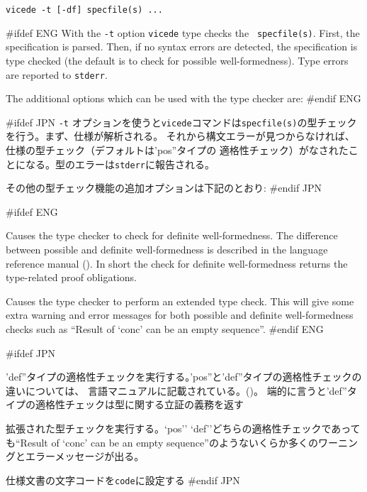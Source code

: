 \documentclass[\pformat,12pt]{article}
\newcommand{\vdmde}{vdmde}
\newcommand{\vdmde}{vppde}
\renewcommand{\vdmde}{vicede}
\newcommand{\aaa}{\tt }
\begin{document}
{\tt \vdmde\ -t [-df] specfile(s) ...}

\vspace{0.5cm}

\noindent
#ifdef ENG
With the {\tt -t} option {\tt \vdmde} type checks the {\tt
  specfile(s)}.  First, the specification is parsed. Then, if no syntax
errors are detected, the specification is type checked (the default
is to check for possible well-formedness). Type errors are reported to
{\aaa stderr}.

The additional options which can be used with the type checker are:
#endif ENG

#ifdef JPN
{\tt -t} オプションを使うと{\tt \vdmde}コマンドは{\tt specfile(s)}の型チェックを行う。まず、仕様が解析される。
それから構文エラーが見つからなければ、仕様の型チェック（デフォルトは'pos''タイプの
適格性チェック）がなされたことになる。型のエラーは{\aaa stderr}に報告される。

その他の型チェック機能の追加オプションは下記のとおり:
#endif JPN

\begin{description}
#ifdef ENG
\item[{\tt -d}] Causes the type checker to check for definite
  well-formedness.  The difference between possible and definite
  well-formedness is described in the language reference manual
  (). In 
  short the check for definite well-formedness returns the
  type-related proof obligations.
  
\item[{\tt -f}] Causes the type checker to perform an extended type
  check.  This will give some extra warning and error messages for
  both possible and definite well-formedness checks such as ``Result
  of `conc' can be an empty sequence''.
#endif ENG

#ifdef JPN
\item[{\tt -d}]
  'def''タイプの適格性チェックを実行する。'pos''と'def''タイプの適格性チェックの違いについては、
  言語マニュアルに記載されている。()。
  端的に言うと'def''タイプの適格性チェックは型に関する立証の義務を返す
  
\item[{\tt -f}]
  拡張された型チェックを実行する。`pos'' `def''どちらの適格性チェックであっても``Result of `conc' 
  can be an empty sequence''のようないくらか多くのワーニングとエラーメッセージが出る。

\item[{\tt -W code}] 仕様文書の文字コードを{\tt code}に設定する
#endif JPN
\end{description}
\end{document}
